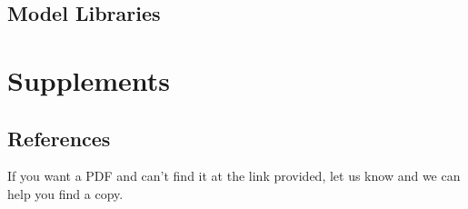 \documentclass[
]{book}
\begin{document}
\hypertarget{model-libraries}{%
\chapter{Model Libraries}\label{model-libraries}}

\hypertarget{part-supplements}{%
\part{Supplements}\label{part-supplements}}

\hypertarget{references}{%
\chapter{References}\label{references}}

If you want a PDF and can't find it at the link provided, let us know and we can help you find a copy.
\end{document}
